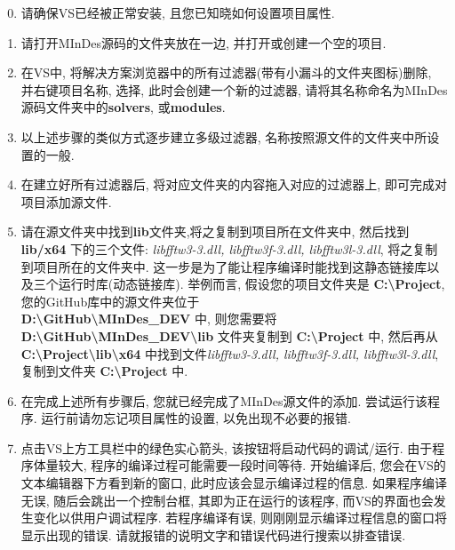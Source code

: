 \begin{enumerate}
    \setcounter{enumi}{-1}
    \item 请确保VS已经被正常安装, 且您已知晓如何设置项目属性.
    \item 请打开MInDes源码的文件夹放在一边, 并打开或创建一个空的项目.
    \item 在VS中, 将解决方案浏览器中的所有过滤器(带有小漏斗的文件夹图标)删除, 并右键项目名称, 选择{},
          此时会创建一个新的过滤器, 请将其名称命名为MInDes源码文件夹中的\textbf{solvers}, 或\textbf{modules}.
    \item 以上述步骤的类似方式逐步建立多级过滤器, 名称按照源文件的文件夹中所设置的一般.
    \item 在建立好所有过滤器后, 将对应文件夹的内容拖入对应的过滤器上, 即可完成对项目添加源文件.
    \item 请在源文件夹中找到\textbf{lib}文件夹,将之复制到项目所在文件夹中, 然后找到 \textbf{lib/x64} 下的三个文件:
          \emph{libfftw3-3.dll, libfftw3f-3.dll, libfftw3l-3.dll},
          将之复制到项目所在的文件夹中. 这一步是为了能让程序编译时能找到这静态链接库以及三个运行时库(动态链接库). 举例而言,
          假设您的项目文件夹是 \textbf{C:\textbackslash{}Project}, 您的GitHub库中的源文件夹位于\\
          \textbf{D:\textbackslash{}GitHub\textbackslash{}MInDes\_DEV} 中, 则您需要将
          \textbf{D:\textbackslash{}GitHub\textbackslash{}MInDes\_DEV\textbackslash{}lib} 文件夹复制到
          \textbf{C:\textbackslash{}Project} 中, 然后再从 \textbf{C:\textbackslash{}Project\textbackslash{}lib\textbackslash{}x64}
          中找到文件\emph{libfftw3-3.dll, libfftw3f-3.dll, libfftw3l-3.dll}, 复制到文件夹 \textbf{C:\textbackslash{}Project} 中.
    \item 在完成上述所有步骤后, 您就已经完成了MInDes源文件的添加. 尝试运行该程序. 运行前请勿忘记项目属性的设置, 以免出现不必要的报错.
    \item 点击VS上方工具栏中的绿色实心箭头, 该按钮将启动代码的调试/运行. 由于程序体量较大,
          程序的编译过程可能需要一段时间等待. 开始编译后, 您会在VS的文本编辑器下方看到新的窗口, 此时应该会显示编译过程的信息.
          如果程序编译无误, 随后会跳出一个控制台框, 其即为正在运行的该程序, 而VS的界面也会发生变化以供用户调试程序. 若程序编译有误,
          则刚刚显示编译过程信息的窗口将显示出现的错误. 请就报错的说明文字和错误代码进行搜索以排查错误.
\end{enumerate}

